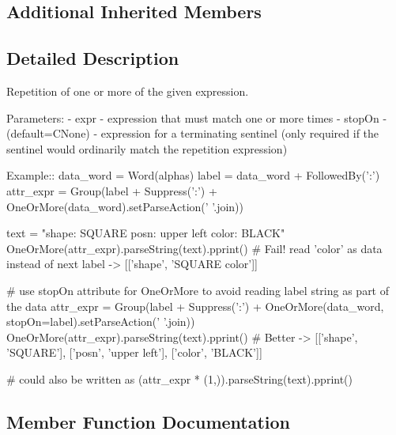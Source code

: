 \subsection*{Additional Inherited Members}


\subsection{Detailed Description}
\begin{DoxyVerb}Repetition of one or more of the given expression.

Parameters:
 - expr - expression that must match one or more times
 - stopOn - (default=C{None}) - expression for a terminating sentinel
      (only required if the sentinel would ordinarily match the repetition 
      expression)          

Example::
    data_word = Word(alphas)
    label = data_word + FollowedBy(':')
    attr_expr = Group(label + Suppress(':') + OneOrMore(data_word).setParseAction(' '.join))

    text = "shape: SQUARE posn: upper left color: BLACK"
    OneOrMore(attr_expr).parseString(text).pprint()  # Fail! read 'color' as data instead of next label -> [['shape', 'SQUARE color']]

    # use stopOn attribute for OneOrMore to avoid reading label string as part of the data
    attr_expr = Group(label + Suppress(':') + OneOrMore(data_word, stopOn=label).setParseAction(' '.join))
    OneOrMore(attr_expr).parseString(text).pprint() # Better -> [['shape', 'SQUARE'], ['posn', 'upper left'], ['color', 'BLACK']]
    
    # could also be written as
    (attr_expr * (1,)).parseString(text).pprint()
\end{DoxyVerb}
 

\subsection{Member Function Documentation}
\mbox{\label{classpkg__resources_1_1__vendor_1_1pyparsing_1_1OneOrMore_a6703409265c6f2920420b9776f322756}} 
